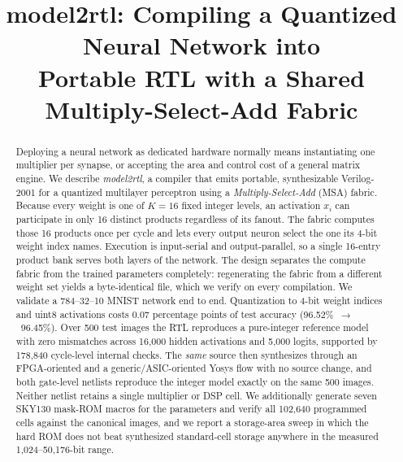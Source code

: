 \documentclass[conference]{IEEEtran}
\begin{document}
\title{model2rtl: Compiling a Quantized Neural Network into\\ Portable RTL with a Shared Multiply-Select-Add Fabric}

\author{
}

\maketitle

\begin{abstract}
Deploying a neural network as dedicated hardware normally means instantiating
one multiplier per synapse, or accepting the area and control cost of a general
matrix engine. We describe \emph{model2rtl}, a compiler that emits portable,
synthesizable Verilog-2001 for a quantized multilayer perceptron using a
\emph{Multiply-Select-Add} (MSA) fabric. Because every weight is one of
$K{=}16$ fixed integer levels, an activation $x_i$ can participate in only 16
distinct products regardless of its fanout. The fabric computes those 16
products once per cycle and lets every output neuron select the one its 4-bit
weight index names. Execution is input-serial and output-parallel, so a single
16-entry product bank serves both layers of the network.
The design separates the compute fabric from the trained parameters
completely: regenerating the fabric from a different weight set yields a
byte-identical file, which we verify on every compilation. We validate a
784--32--10 MNIST network end to end. Quantization to 4-bit weight indices and
uint8 activations costs 0.07 percentage points of test accuracy
(96.52\%~$\rightarrow$~96.45\%). Over 500 test images the RTL reproduces a
pure-integer reference model with zero mismatches across 16{,}000 hidden
activations and 5{,}000 logits, supported by 178{,}840 cycle-level internal
checks. The \emph{same} source then synthesizes through an FPGA-oriented and a
generic/ASIC-oriented Yosys flow with no source change, and both gate-level
netlists reproduce the integer model exactly on the same 500 images. Neither
netlist retains a single multiplier or DSP cell. We additionally generate seven
SKY130 mask-ROM macros for the parameters and verify all 102{,}640 programmed
cells against the canonical images, and we report a storage-area sweep in which
the hard ROM does not beat synthesized standard-cell storage anywhere in the
measured 1{,}024--50{,}176-bit range.
\end{abstract}
\end{document}

